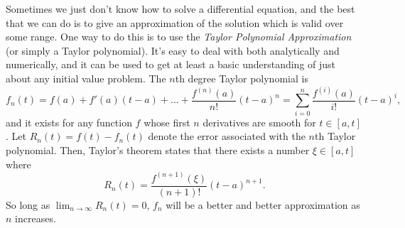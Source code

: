 \documentclass[10pt,driverfallback=hypertex]{report}
\begin{document}
Sometimes we just don't know how to solve a differential equation, and
the best that we can do is to give an approximation of the solution
which is valid over some range. One way to do this is to use the
\emph{Taylor Polynomial Approximation} (or simply a Taylor
polynomial). It's easy to deal with both analytically and numerically,
and it can be used to get at least a basic understanding of just about
any initial value problem. The $n$th degree Taylor polynomial is
\begin{dmath*}
    f_n(t) 
    = f(a) + f'(a)(t-a) + \dots + \frac{f^{(n)}(a)}{n!} (t-a)^n
    = \sum_{i=0}^n \frac{f^{(i)}(a)}{i!}(t-a)^i
,
\end{dmath*}
and it exists for any function $f$ whose first $n$ derivatives are
smooth for $t\in [a,t]$.  Let $R_n(t) = f(t) -f_n(t)$ denote the error
associated with the $n$th Taylor polynomial. Then, Taylor's theorem
states that there exists a number $\xi \in [a,t]$ where
\begin{dmath*}
  \boxed{R_n(t) = \frac{f^{(n+1)}(\xi)}{(n+1)!}(t-a)^{n+1}}.
\end{dmath*}
So long as $\lim_{n\rightarrow \infty} R_n(t) =0$, $f_n$ will be a better and
better approximation as $n$ increases.

\end{document}
